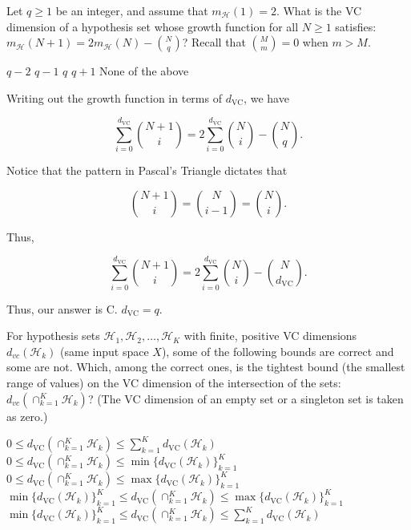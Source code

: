\documentclass[answers]{exam}
\begin{document}
\begin{questions}
\setcounter{question}{7}
\question
Let $q \geq 1$ be an integer, and assume that $m_{\mathcal{H}}(1) = 2$. What is 
the VC dimension of a hypothesis set whose growth function for all $N \geq 1$ 
satisfies: $m_{\mathcal{H}}(N + 1) = 2m_{\mathcal{H}}(N) - \binom{N}{q}$? Recall 
that $\binom{M}{m} = 0$ when $m > M$.
\begin{choices}
    \choice $q - 2$
    \choice $q - 1$
    \choice $q$
    \choice $q + 1$
    \choice None of the above
\end{choices}

\begin{solution}
Writing out the growth function in terms of $d_{\text{VC}}$, we have

\[
\sum_{i=0}^{d_{\text{VC}}} \binom{N+1}{i} = 2 \sum_{i=0}^{d_{\text{VC}}} \binom{N}{i} - \binom{N}{q}
.\] 

Notice that the pattern in Pascal's Triangle dictates that

\[
\binom{N+1}{i} = \binom{N}{i-1} = \binom{N}{i}
.\] 

Thus,

\[
\sum_{i=0}^{d_{\text{VC}}} \binom{N+1}{i} = 2 \sum_{i=0}^{d_{\text{VC}}} \binom{N}{i} - \binom{N}{d_{\text{VC}}}
.\] 

Thus, our answer is C. $d_{\text{VC}} = q$.
\end{solution}

\question
For hypothesis sets $\mathcal{H}_{1}, \mathcal{H}_2, \ldots, \mathcal{H}_K$ 
with finite, positive VC dimensions $d_{vc}(\mathcal{H}_k)$ (same input 
space $X$), some of the following bounds are correct and some are not. Which, 
among the correct ones, is the tightest bound (the smallest range of values) 
on the VC dimension of the intersection of the sets: $d_{vc}(\cap_{k=1}^K 
\mathcal{H}_k)$? (The VC dimension of an empty set or a singleton set is 
taken as zero.)
\begin{choices}
    \choice $0 \leq d_{\text{VC}}(\cap_{k=1}^K \mathcal{H}_k) \leq \sum_{k=1}^K d_{\text{VC}}(\mathcal{H}_k)$
    \choice $0 \leq d_{\text{VC}}(\cap_{k=1}^K \mathcal{H}_k) \leq \min\{d_{\text{VC}}(\mathcal{H}_k)\}_{k=1}^K$
    \choice $0 \leq d_{\text{VC}}(\cap_{k=1}^K \mathcal{H}_k) \leq \max\{d_{\text{VC}}(\mathcal{H}_k)\}_{k=1}^K$
    \choice $\min\{d_{\text{VC}}(\mathcal{H}_k)\}_{k=1}^K \leq d_{\text{VC}}(\cap_{k=1}^K \mathcal{H}_k) \leq 
    \max\{d_{\text{VC}}(\mathcal{H}_k)\}_{k=1}^K$
    \choice $\min\{d_{\text{VC}}(\mathcal{H}_k)\}_{k=1}^K \leq d_{\text{VC}}(\cap_{k=1}^K \mathcal{H}_k) \leq 
    \sum_{k=1}^K d_{\text{VC}}(\mathcal{H}_k)$
\end{choices}


\end{questions}
\end{document}
